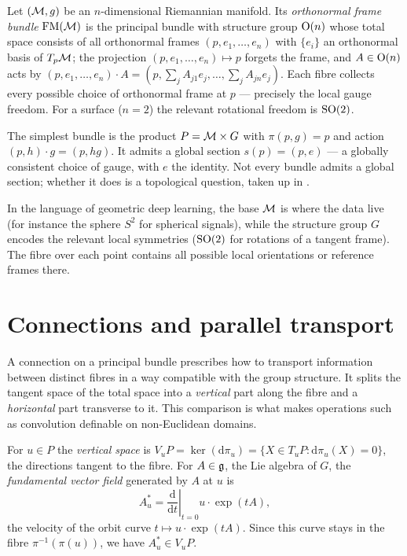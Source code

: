 \begin{example}
\label{ex:gauge:frame-bundle}
Let $(\mathcal{M}, g)$ be an $n$-dimensional Riemannian manifold. Its
\emph{orthonormal frame bundle} $\mathrm{FM}(\mathcal{M})$ is the principal bundle with
structure group $\operatorname{O}(n)$ whose total space consists of all orthonormal frames
$(p, e_1, \ldots, e_n)$ with $\{e_i\}$ an orthonormal basis of $T_p\mathcal{M}$; the
projection $(p, e_1, \ldots, e_n) \mapsto p$ forgets the frame, and $A \in \operatorname{O}(n)$
acts by $(p, e_1, \ldots, e_n) \cdot A = (p, \sum_j A_{j1} e_j, \ldots, \sum_j
A_{jn} e_j)$. Each fibre collects every possible choice of orthonormal frame at
$p$ --- precisely the local gauge freedom. For a surface ($n = 2$) the relevant
rotational freedom is $\operatorname{SO}(2)$.
\end{example}

\begin{example}
\label{ex:gauge:trivial-bundle}
The simplest bundle is the product $P = \mathcal{M} \times G$ with $\pi(p, g) = p$ and
action $(p, h) \cdot g = (p, hg)$. It admits a global section $s(p) = (p, e)$ ---
a globally consistent choice of gauge, with $e$ the identity. Not every bundle
admits a global section; whether it does is a topological question, taken up in
.
\end{example}

In the language of geometric deep learning, the base $\mathcal{M}$ is where the data
live (for instance the sphere $S^2$ for spherical signals), while the structure
group $G$ encodes the relevant local symmetries ($\operatorname{SO}(2)$ for rotations of a
tangent frame). The fibre over each point contains all possible local
orientations or reference frames there.

\section{Connections and parallel transport}
\label{sec:gauge:transport}

A connection on a principal bundle prescribes how to transport information
between distinct fibres in a way compatible with the group structure. It splits
the tangent space of the total space into a \emph{vertical} part along the
fibre and a \emph{horizontal} part transverse to it. This comparison is what
makes operations such as convolution definable on non-Euclidean domains.

\begin{definition}
\label{def:gauge:vertical}
For $u \in P$ the \emph{vertical space} is
$V_u P = \ker(\mathrm{d}\pi_u) = \{X \in T_u P : \mathrm{d}\pi_u(X) = 0\}$, the
directions tangent to the fibre. For $A \in \mathfrak{g}$, the Lie algebra of $G$, the
\emph{fundamental vector field} generated by $A$ at $u$ is
\[
  A^*_u = \left.\frac{\mathrm{d}}{\mathrm{d}t}\right|_{t=0} u \cdot \exp(tA),
\]
the velocity of the orbit curve $t \mapsto u \cdot \exp(tA)$. Since this curve
stays in the fibre $\pi^{-1}(\pi(u))$, we have $A^*_u \in V_u P$.
\end{definition}

